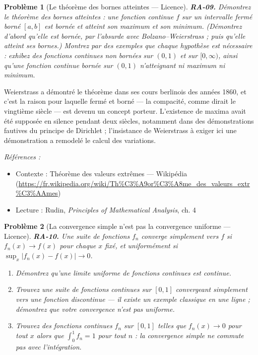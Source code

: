 \documentclass[11pt]{article}
\newtheorem{problem}{Problème}
\newenvironment{refs}{\par\small\noindent\emph{Références :}\begin{itemize}\setlength\itemsep{0pt}}{\end{itemize}\normalsize}
\begin{document}
\bigskip

\begin{problem}[{Le théorème des bornes atteintes --- Licence}]
\textbf{RA-09.} Démontrez le théorème des bornes atteintes : une fonction
continue $ f $ sur un intervalle fermé borné $ [a, b] $ est bornée et atteint son maximum et son
minimum. (Démontrez d'abord qu'elle est bornée, par l'absurde avec Bolzano--Weierstrass ; puis qu'elle
atteint ses bornes.) Montrez par des exemples que chaque hypothèse est nécessaire : exhibez des
fonctions continues non bornées sur $ (0, 1) $ et sur $ [0, \infty) $, ainsi qu'une fonction
continue bornée sur $ (0, 1) $ n'atteignant ni maximum ni minimum.
\end{problem}

\noindent Weierstrass a démontré le théorème dans ses cours berlinois des années 1860, et
c'est la raison pour laquelle \og{} fermé et borné \fg{} --- la compacité, comme dirait le vingtième siècle ---
est devenu un concept porteur. L'existence de maxima avait été supposée en silence pendant deux
siècles, notamment dans des démonstrations fautives du principe de Dirichlet ; l'insistance de
Weierstrass à exiger ici une démonstration a remodelé le calcul des variations.

\begin{refs}
\item Contexte : Théorème des valeurs extrêmes --- Wikipédia (\url{https://fr.wikipedia.org/wiki/Th%C3%A9or%C3%A8me_des_valeurs_extr%C3%AAmes})
\item Lecture : Rudin, \textit{Principles of Mathematical Analysis}, ch. 4
\end{refs}

\bigskip

\begin{problem}[{La convergence simple n'est pas la convergence uniforme --- Licence}]
\textbf{RA-10.} Une suite de fonctions $ f_n $ converge
\textit{simplement} vers $ f $ si $ f_n(x) \to f(x) $ pour chaque $ x $ fixé, et
\textit{uniformément} si $ \sup_x |f_n(x) - f(x)| \to 0 $.
\begin{enumerate}
\item[(a)] Démontrez qu'une limite uniforme de fonctions continues est continue.
\item[(b)] Trouvez une suite de fonctions continues sur
$ [0, 1] $ convergeant simplement vers une fonction discontinue --- il existe un exemple classique
en une ligne ; démontrez que votre convergence n'est pas uniforme.
\item[(c)] Trouvez des fonctions continues $ f_n $ sur
$ [0, 1] $ telles que $ f_n(x) \to 0 $ pour tout $ x $ alors que $ \int_0^1 f_n = 1 $ pour
tout $ n $ : la convergence simple ne commute pas avec l'intégration.
\end{enumerate}

\end{problem}
\end{document}
